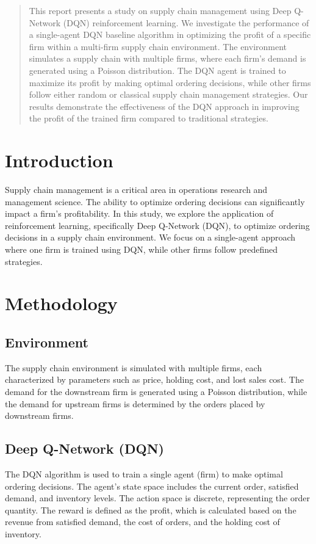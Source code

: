 \documentclass[nohyperref]{article}
\theoremstyle{plain}
\theoremstyle{definition}
\theoremstyle{remark}
\begin{document}
\printAffiliationsAndNotice{\icmlEqualContribution} %


\begin{abstract}
    This report presents a study on supply chain management using Deep Q-Network (DQN) reinforcement learning. We investigate the performance of a single-agent DQN baseline algorithm in optimizing the profit of a specific firm within a multi-firm supply chain environment. The environment simulates a supply chain with multiple firms, where each firm's demand is generated using a Poisson distribution. The DQN agent is trained to maximize its profit by making optimal ordering decisions, while other firms follow either random or classical supply chain management strategies. Our results demonstrate the effectiveness of the DQN approach in improving the profit of the trained firm compared to traditional strategies.
    \end{abstract}

    \section{Introduction}
    Supply chain management is a critical area in operations research and management science. The ability to optimize ordering decisions can significantly impact a firm's profitability. In this study, we explore the application of reinforcement learning, specifically Deep Q-Network (DQN), to optimize ordering decisions in a supply chain environment. We focus on a single-agent approach where one firm is trained using DQN, while other firms follow predefined strategies.
    
    \section{Methodology}
    \subsection{Environment}
    The supply chain environment is simulated with multiple firms, each characterized by parameters such as price, holding cost, and lost sales cost. The demand for the downstream firm is generated using a Poisson distribution, while the demand for upstream firms is determined by the orders placed by downstream firms.
    
    \subsection{Deep Q-Network (DQN)}
    The DQN algorithm is used to train a single agent (firm) to make optimal ordering decisions. The agent's state space includes the current order, satisfied demand, and inventory levels. The action space is discrete, representing the order quantity. The reward is defined as the profit, which is calculated based on the revenue from satisfied demand, the cost of orders, and the holding cost of inventory.
    
\end{document}

